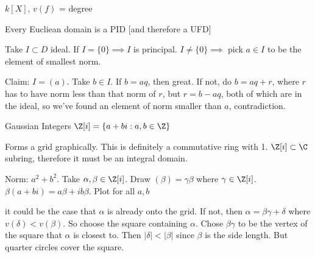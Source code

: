 \documentclass[10pt]{article}
\begin{document}
\begin{exm*}
    $k[X]$, $v(f)$ = degree
\end{exm*}

\begin{thm}
    Every Eucliean domain is a PID [and therefore a UFD]
\end{thm}
Take $I \subset D$ ideal. If $I = \{0\} \implies I$ is principal. $I \neq \{0\} \implies$ pick $a \in I$ to be the element of smallest norm.

Claim: $I = (a)$. Take $b \in I$. If $b = aq$, then great. If not, do $b = aq + r$, where $r$ has to have norm less than that norm of $r$, but $r = b - aq$, both of which are in the ideal, so we've found an element of norm smaller than $a$, contradiction.

\begin{exm*}
    Gaussian Integers $\Z[i] = \{a + bi: a, b \in \Z\}$
\end{exm*}
Forms a grid graphically. This is definitely a commutative ring with 1. $\Z[i] \subset \C$ subring, therefore it must be an integral domain.

Norm: $a^2 + b^2$. Take $\alpha, \beta \in \Z[i]$. Draw $(\beta) = \gamma\beta$ where $\gamma \in \Z[i]$. $\beta(a + bi) = a\beta + i b \beta$. Plot for all $a, b$

it could be the case that $\alpha$ is already onto the grid. If not, then $\alpha = \beta\gamma + \delta$ where $v(\delta) < v(\beta)$. So choose the square containing $\alpha$. Chose $\beta\gamma$ to be the vertex of the square that $\alpha$ is closest to. Then $|\delta| < |\beta|$ since $\beta$ is the side length. But quarter circles cover the square.
\end{document}
